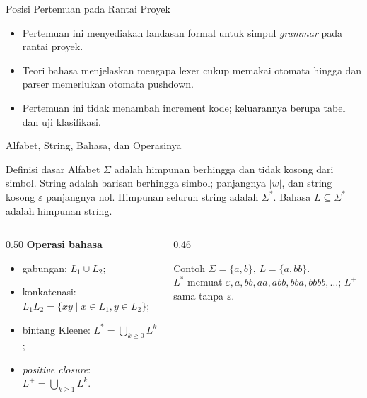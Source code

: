 \documentclass[aspectratio=169,10pt,t]{beamer}
\begin{document}
\begin{frame}{Posisi Pertemuan pada Rantai Proyek}

  \vspace{2pt}
  \begin{itemize}
    \item Pertemuan ini menyediakan landasan formal untuk simpul
          \textit{grammar} pada rantai proyek.
    \item Teori bahasa menjelaskan mengapa lexer cukup memakai otomata
          hingga dan parser memerlukan otomata pushdown.
    \item Pertemuan ini tidak menambah increment kode; keluarannya
          berupa tabel dan uji klasifikasi.
  \end{itemize}
\end{frame}

\begin{frame}{Alfabet, String, Bahasa, dan Operasinya}
  \begin{block}{Definisi dasar}
    \small
    Alfabet \(\Sigma\) adalah himpunan berhingga dan tidak kosong dari
    simbol. String adalah barisan berhingga simbol; panjangnya
    \(|w|\), dan string kosong \(\varepsilon\) panjangnya nol.
    Himpunan seluruh string adalah \(\Sigma^{*}\). Bahasa
    \(L \subseteq \Sigma^{*}\) adalah himpunan string.
  \end{block}

  \vspace{2pt}
  \begin{columns}[T,onlytextwidth]
    \begin{column}{0.50\textwidth}
      \footnotesize
      \textbf{Operasi bahasa}
      \begin{itemize}
        \item gabungan: \(L_1 \cup L_2\);
        \item konkatenasi: \(L_1L_2 = \{xy \mid x \in L_1, y \in L_2\}\);
        \item bintang Kleene: \(L^{*} = \bigcup_{k \ge 0} L^k\);
        \item \textit{positive closure}: \(L^{+} = \bigcup_{k \ge 1} L^k\).
      \end{itemize}
    \end{column}
    \begin{column}{0.46\textwidth}
      \begin{exampleblock}{Contoh}
        \footnotesize
        \(\Sigma=\{a,b\}\), \(L=\{a,bb\}\).\\
        \(L^{*}\) memuat \(\varepsilon, a, bb, aa, abb, bba, bbbb,
        \ldots\); \(L^{+}\) sama tanpa \(\varepsilon\).
      \end{exampleblock}
    \end{column}
  \end{columns}
\end{frame}
\end{document}
